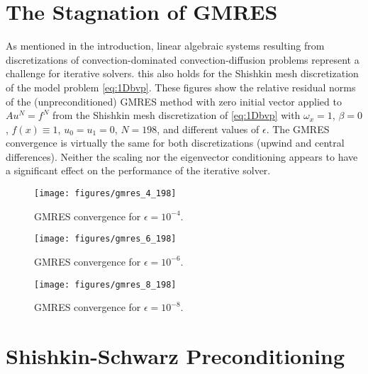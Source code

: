 \section{The Stagnation of GMRES}
\label{1D:GMRESstag}

As mentioned in the introduction, linear algebraic systems resulting from
discretizations of convection-dominated convection-diffusion problems represent
a challenge for iterative solvers.  this also holds for the Shishkin mesh discretization of the
model problem \eqref{eq:1Dbvp}. These figures show the relative 
residual norms of the (unpreconditioned) GMRES method with zero initial vector
applied to $Au^N=f^N$ from the Shishkin mesh discretization of \eqref{eq:1Dbvp}
with $\omega_x=1$, $\beta=0$, $f(x)\equiv 1$, $u_0=u_1=0$, $N=198$, and different
values of $\epsilon$. The GMRES convergence is virtually the same for both
discretizations (upwind and central differences). Neither the scaling nor the
eigenvector conditioning appears to have a significant effect on the
performance of the iterative solver.

\begin{figure}[h!]
\begin{minipage}[t]{0.48\linewidth}
\texttt{[image: figures/gmres\_4\_198]}
\caption{GMRES convergence for $\epsilon=10^{-4}$.}\label{fig:back:GMRES.N198.eps4}
\end{minipage}
%
\begin{minipage}[t]{0.48\linewidth}
\texttt{[image: figures/gmres\_6\_198]}
\caption{GMRES convergence for $\epsilon=10^{-6}$.}\label{fig:back:GMRES.N198.eps6}
\end{minipage}
\end{figure}
%
\begin{figure}
\begin{center}
\begin{minipage}[t]{0.48\linewidth}
\texttt{[image: figures/gmres\_8\_198]}
\caption{GMRES convergence for $\epsilon=10^{-8}$.}\label{fig:back:GMRES.N198.eps4}
\end{minipage}
\end{center}
\end{figure}

\section{Shishkin-Schwarz Preconditioning}
\label{1D:ShishScwarzPrecon}

